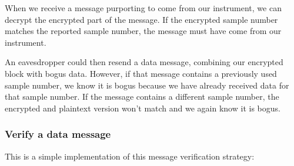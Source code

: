 When we receive a message purporting to come from our instrument, we can decrypt the encrypted part of the message.
If the encrypted sample number matches the reported sample number, the message must have come from our instrument.

An eavesdropper could then resend a data message, combining our encrypted block with bogus data.
However, if that message contains a previously used sample number, we know it is bogus because we have already received data for that sample number. 
If the message contains a different sample number, the encrypted and plaintext version won't match and we again know it is bogus.


\subsubsection{\howto Verify a data message}
This is a simple implementation of this message verification strategy:
